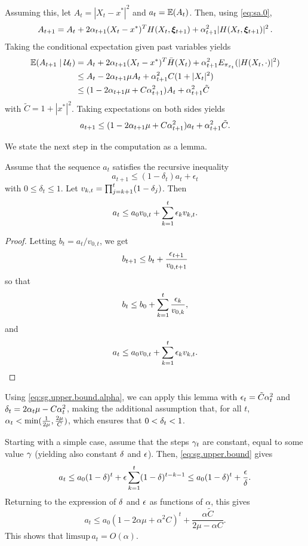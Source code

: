 Assuming this, let $A_t = |X_t - x^*|^2$ and  $a_t = \bm{\mathbb E}(A_t)$. Then, using \cref{eq:sa.0},
\[
A_{t+1} = A_t + 2\alpha_{t+1} (X_t - x^*)^T H(X_t, \bm\xi_{t+1}) + \alpha_{t+1}^2 |H(X_t, \bm\xi_{t+1})|^2\,.
\]
Taking the conditional expectation given past variables yields
\begin{align*}
\bm{\mathbb E}(A_{t+1}\mid{\mathcal U}_t) &= A_t + 2\alpha_{t+1} (X_t - x^*)^T \bar H(X_t) + \alpha_{t+1}^2 E_{\pi_{x_t}}(|H(X_t, \cdot)|^2)\\
&\leq A_t - 2\alpha_{t+1}\mu A_t  + \alpha_{t+1}^2 C (1+|X_t|^2)\\ 
&\leq (1 - 2\alpha_{t+1}\mu + C\alpha_{t+1}^2)  A_t  + \alpha_{t+1}^2 \tilde C
\end{align*}
with $\tilde C = 1 + |x^*|^2$. Taking expectations on both sides yields
\begin{equation}
\label{eq:sg.upper.bound.alpha}
a_{t+1} \leq (1 - 2\alpha_{t+1}\mu + C\alpha_{t+1}^2)  a_t  + \alpha_{t+1}^2 \tilde C.
\end{equation}

We state the next step in the computation as a lemma.
\begin{lemma}
\label{lem:sg.upper.bound}
Assume that the sequence $a_t$ satisfies the recursive inequality 
\begin{equation}
\label{eq:sg.upper.bound.0}
a_{t+1} \leq (1-\delta_t) a_t + \epsilon_t
\end{equation}
with $0 \leq \delta_t \leq 1$.
Let $v_{k,t} = \prod_{j=k+1}^t (1-\delta_{j})$. Then
\begin{equation}
a_t \leq a_0 v_{0,t} + \sum_{k=1}^t \epsilon_k v_{k,t}.
\label{eq:sg.upper.bound}
\end{equation}
\end{lemma}
\begin{proof}
Letting $b_t = a_t /v_{0,t}$, we get
\[
b_{t+1} \leq b_t + \frac{\epsilon_{t+1}}{v_{0,t+1}}
\]
so that
\[
b_t \leq b_0 + \sum_{k=1}^t \frac{\epsilon_{k}}{v_{0,k}},
\]
and
\[
a_t \leq a_0 v_{0,t} + \sum_{k=1}^t \epsilon_k v_{k,t}.
\]
\end{proof}
Using \cref{eq:sg.upper.bound.alpha}, 
we can apply this lemma with $\epsilon_t = \tilde C \alpha_t^2$ and $\delta_t = 2\alpha_{t}\mu - C\alpha_{t}^2$, making the additional assumption that, for all $t$, $\alpha_t < \min(\frac1{2\mu}, \frac{2\mu}{C})$, which ensures that $0<\delta_t < 1$. 

Starting with a simple case, assume that the steps $\gamma_t$ are constant, equal to some value $\gamma$ (yielding also constant $\delta$ and $\epsilon$). Then, \cref{eq:sg.upper.bound} gives 
\begin{equation}
\label{eq:sgd.constant}
a_t \leq a_0 (1-\delta)^t + \epsilon \sum_{k=1}^t (1-\delta)^{t-k-1} \leq a_0 (1-\delta)^t + \frac{\epsilon}{\delta}.
\end{equation}
Returning to the expression of $\delta$ and $\epsilon$ as functions of $\alpha$, this gives
\[
a_t \leq a_0 (1-2\alpha\mu+\alpha^2C)^t + \frac{\alpha \tilde C}{2\mu - \alpha C}.
\]
This shows that $\mathrm{limsup}\, a_t = O(\alpha)$.

